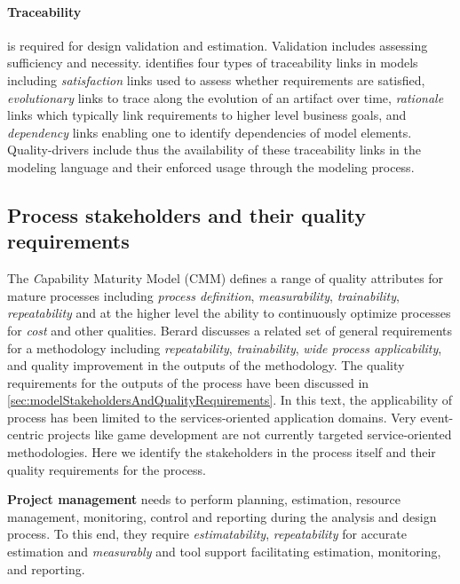 \paragraph{Traceability} is required for design validation and estimation. Validation includes assessing sufficiency and necessity. \cite{ramesh_toward_2001} identifies four types of traceability links in models including \emph{satisfaction} links used to assess whether requirements are satisfied, \emph{evolutionary} links to trace along the evolution of an artifact over time, \emph{rationale} links which typically link requirements to higher level business goals, and \emph{dependency} links enabling one to identify dependencies of model elements. Quality-drivers include thus the availability of these traceability links in the modeling language and their enforced usage through the modeling process.


\subsection{Process stakeholders and their quality requirements}

The {\emph Capability Maturity Model} (CMM) \cite{paulk_capability_1993} defines a range of quality attributes for mature processes including \emph{process definition}, \emph{measurability}, \emph{trainability}, \emph{repeatability} and at the higher level the ability to continuously optimize processes for \emph{cost} and other qualities. Berard\cite{berard_what_1995} discusses a related set of general requirements for a methodology including \emph{repeatability}, \emph{trainability}, \emph{wide process applicability}, and quality improvement in the outputs of the methodology. The quality requirements for the outputs of the process have been discussed in \ref{sec:modelStakeholdersAndQualityRequirements}. In this text, the applicability of process has been limited to the services-oriented application domains. Very event-centric projects like game development are not currently targeted service-oriented methodologies. Here we identify the stakeholders in the process itself and their quality requirements for the process. 

{\bf Project management} needs to perform planning, estimation, resource management, monitoring, control and reporting during the analysis and design process. To this end, they require \emph{estimatability}, \emph{repeatability} for accurate estimation and \emph{measurably} and tool support facilitating estimation, monitoring, and reporting.

